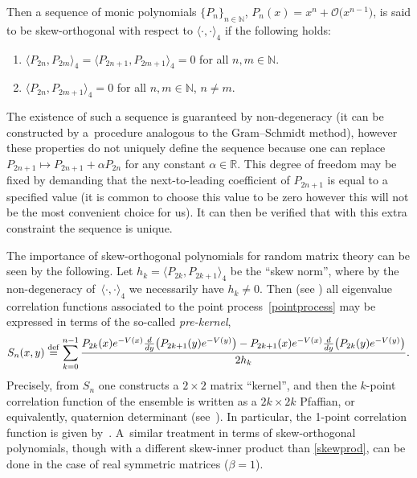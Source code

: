\documentclass[11pt]{article}
\numberwithin{equation}{section}
\numberwithin{equation}{section}
\begin{document}
Then a sequence of monic polynomials $\{ P_n \}_{n \in \mathbb{N}}$, $P_n(x) = x^n + \mathcal{O}\big(x^{n-1}\big)$, is said to be skew-orthogonal with respect to $\langle \cdot, \cdot \rangle_4$ if the following holds:
\begin{enumerate}\itemsep=0pt
\item[(1)] $\langle P_{2n}, P_{2m} \rangle_4 = \langle P_{2n+1}, P_{2m+1} \rangle_4 = 0$ for all $n,m \in \mathbb{N}$.
\item[(2)] $\langle P_{2n}, P_{2m+1} \rangle_4 = 0$ for all $n, m \in \mathbb{N}$, $n\neq m$.
\end{enumerate}
The existence of such a sequence is guaranteed by non-degeneracy (it can be constructed by a~procedure analogous to the Gram--Schmidt method), however these properties do not uniquely define the sequence because one can replace $P_{2n+1} \mapsto P_{2n+1} + \alpha P_{2n}$ for any constant $\alpha \in \mathbb{R}$. This degree of freedom may be fixed by demanding that the next-to-leading coefficient of $P_{2n+1}$ is equal to a specified value (it is common to choose this value to be zero however this will not be the most convenient choice for us). It can then be verified that with this extra constraint the sequence is unique.

The importance of skew-orthogonal polynomials for random matrix theory can be seen by the following. Let $h_k = \langle P_{2k}, P_{2k+1} \rangle_4$ be the \enquote{skew norm}, where by the non-degeneracy of~${\langle \cdot, \cdot \rangle_4}$ we necessarily have $h_k \neq 0$. Then (see \cite[Propositions~6.1.6 and 6.1.7]{loggases}) all eigenvalue correlation functions associated to the point process~\eqref{pointprocess} may be expressed in terms of the so-called \textit{pre-kernel},
\begin{equation}\label{prekernel}
S_n(x,y) \overset{\mathrm{def}}{=} \sum_{k=0}^{n-1} \frac{ P_{2k}(x) {\rm e}^{-V(x)} \frac{\rm d}{{\rm d}y}\big( P_{2k+1}(y) {\rm e}^{-V(y)} \big) - P_{2k+1}(x) {\rm e}^{-V(x)} \frac{\rm d}{{\rm d}y}\big( P_{2k}(y) {\rm e}^{-V(y)} \big)}{2 h_k}.
\end{equation}
Precisely, from $S_n$ one constructs a $2 \times 2$ matrix \enquote{kernel}, and then the $k$-point correlation function of the ensemble is written as a $2k \times 2k$ Pfaffian, or equivalently, quaternion determinant (see~\cite[Chapter 6]{loggases}). In particular, the 1-point correlation function is given by~. A~similar treatment in terms of skew-orthogonal polynomials, though with a different skew-inner product than \eqref{skewprod}, can be done in the case of real symmetric matrices ($\beta =1$).
\end{document}
